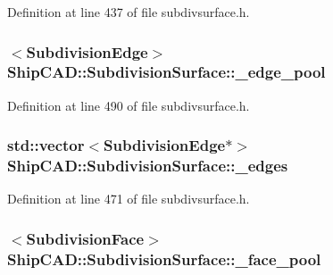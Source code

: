 Definition at line 437 of file subdivsurface.\+h.

\subsubsection[{\texorpdfstring{\+\_\+edge\+\_\+pool}{_edge_pool}}]{$<${\bf Subdivision\+Edge}$>$ Ship\+C\+A\+D\+::\+Subdivision\+Surface\+::\+\_\+edge\+\_\+pool\hspace{0.3cm}{\ttfamily [protected]}}\hypertarget{classShipCAD_1_1SubdivisionSurface_a47d61792772139e74bebfb11eaea21a7}{}\label{classShipCAD_1_1SubdivisionSurface_a47d61792772139e74bebfb11eaea21a7}


Definition at line 490 of file subdivsurface.\+h.

\subsubsection[{\texorpdfstring{\+\_\+edges}{_edges}}]{\setlength{\rightskip}{0pt plus 5cm}std\+::vector$<${\bf Subdivision\+Edge}$\ast$$>$ Ship\+C\+A\+D\+::\+Subdivision\+Surface\+::\+\_\+edges\hspace{0.3cm}{\ttfamily [protected]}}\hypertarget{classShipCAD_1_1SubdivisionSurface_a709c44779394f03c06c16adba6187ecd}{}\label{classShipCAD_1_1SubdivisionSurface_a709c44779394f03c06c16adba6187ecd}


Definition at line 471 of file subdivsurface.\+h.

\subsubsection[{\texorpdfstring{\+\_\+face\+\_\+pool}{_face_pool}}]{$<${\bf Subdivision\+Face}$>$ Ship\+C\+A\+D\+::\+Subdivision\+Surface\+::\+\_\+face\+\_\+pool\hspace{0.3cm}{\ttfamily [protected]}}\hypertarget{classShipCAD_1_1SubdivisionSurface_a6064ab4cdadae400c79c4cbcba906b3a}{}\label{classShipCAD_1_1SubdivisionSurface_a6064ab4cdadae400c79c4cbcba906b3a}


